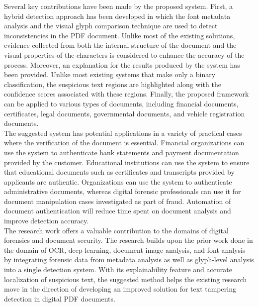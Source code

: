 \noindent Several key contributions have been made by the proposed system. First, a hybrid detection approach has been developed in which the font metadata analysis and the visual glyph comparison technique are used to detect inconsistencies in the PDF document. Unlike most of the existing solutions, evidence collected from both the internal structure of the document and the visual properties of the characters is considered to enhance the accuracy of the process. Moreover, an explanation for the results produced by the system has been provided. Unlike most existing systems that make only a binary classification, the suspicious text regions are highlighted along with the confidence scores associated with these regions. Finally, the proposed framework can be applied to various types of documents, including financial documents, certificates, legal documents, governmental documents, and vehicle registration documents.\\

\noindent The suggested system has potential applications in a variety of practical cases where the verification of the document is essential. Financial organizations can use the system to authenticate bank statements and payment documentation provided by the customer. Educational institutions can use the system to ensure that educational documents such as certificates and transcripts provided by applicants are authentic. Organizations can use the system to authenticate administrative documents, whereas digital forensic professionals can use it for document manipulation cases investigated as part of fraud. Automation of document authentication will reduce time spent on document analysis and improve detection accuracy.\\

\noindent The research work offers a valuable contribution to the domains of digital forensics and document security. The research builds upon the prior work done in the domain of OCR, deep learning, document image analysis, and font analysis by integrating forensic data from metadata analysis as well as glyph-level analysis into a single detection system. With its explainability feature and accurate localization of suspicious text, the suggested method helps the existing research move in the direction of developing an improved solution for text tampering detection in digital PDF documents.

